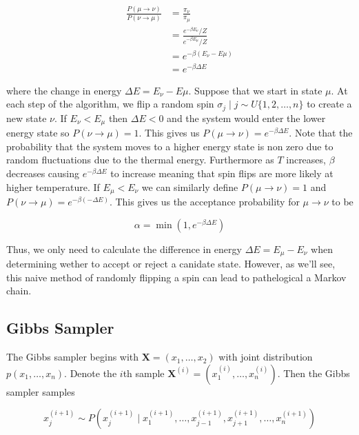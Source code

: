 \documentclass{article}
\begin{document}
\begin{align}
    \frac{P(\mu \rightarrow \nu)}{P(\nu \rightarrow \mu)}
    &= \frac{\pi_{\nu}}{\pi_{\mu}} \\
    &= \frac{e^{-\beta E_{\nu}} / Z}{e^{-\beta E_{\mu}} / Z} \\
    &= e^{-\beta(E_{\nu} - E{\mu})} \\
    &= e^{-\beta \Delta E}
\end{align}

where the change in energy $\Delta E = E_{\nu} - E{\mu}$. Suppose that we start in state $\mu$. At each step of the algorithm, we flip a random spin $\sigma_j \mid j \sim U\{1,2,\ldots,n\}$ to create a new state $\nu$.
If $E_{\nu} < E_{\mu}$ then $\Delta E < 0$ and the system would enter the lower energy state so $P(\nu \rightarrow \mu) = 1$. This gives us
$P(\mu \rightarrow \nu) = e^{-\beta \Delta E}$. Note that the probability that the system moves to a higher energy state 
is non zero due to random fluctuations due to the thermal energy. Furthermore as $T$ increases, $\beta$ decreases causing $e^{-\beta \Delta E}$
to increase meaning that spin flips are more likely at higher temperature. If $E_{\mu} < E_{\nu}$ we can similarly define $P(\mu \rightarrow \nu) = 1$
and $P(\nu \rightarrow \mu) = e^{-\beta(-\Delta E)}$. This gives us the acceptance probability for $\mu \rightarrow \nu$ to be

\begin{equation}
    \alpha = \min(1, e^{-\beta \Delta E})
\end{equation}

Thus, we only need to calculate the difference in energy $\Delta E = E_{\mu} - E_{\nu}$ when determining wether to accept or reject a canidate state.
However, as we'll see, this naive method of randomly flipping a spin can lead to pathelogical a Markov chain.

\subsection{Gibbs Sampler}
The Gibbs sampler begins with $\mathbf{X} = (x_1, \ldots, x_2)$ with joint distribution $p(x_1, \ldots, x_n)$. Denote the $i$th sample
$\mathbf{X}^{(i)} = (x_1^{(i)}, \ldots, x_n^{(i)})$. Then the Gibbs sampler samples

\begin{equation} \label{eq:eq33}
    x_j^{(i+1)} \sim P(x_j^{(i+1)} \mid x_1^{(i+1)}, \ldots, x_{j-1}^{(i+1)}, x_{j+1}^{(i+1)}, \ldots, x_{n}^{(i+1)})
\end{equation}
\end{document}

